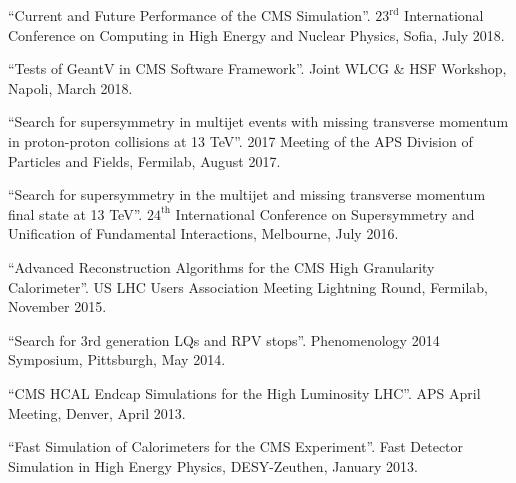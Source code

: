 \begin{nbdescription}[leftmargin=12pt,font=\normalfont,labelsep=0em]
\item ``Current and Future Performance of the CMS Simulation''. $23^{\text{rd}}$ International Conference on Computing in High Energy and Nuclear Physics, Sofia, July 2018.
\item ``Tests of GeantV in CMS Software Framework''. Joint WLCG \& HSF Workshop, Napoli, March 2018.
\item ``Search for supersymmetry in multijet events with missing transverse momentum in proton-proton collisions at 13 TeV''. 2017 Meeting of the APS Division of Particles and Fields, Fermilab, August 2017.
\item ``Search for supersymmetry in the multijet and missing transverse momentum final state at 13 TeV''. $24^{\text{th}}$ International Conference on Supersymmetry and Unification of Fundamental Interactions, Melbourne, July 2016.
\item ``Advanced Reconstruction Algorithms for the CMS High Granularity Calorimeter''. US LHC Users Association Meeting Lightning Round, Fermilab, November 2015.
\item ``Search for 3rd generation LQs and RPV stops''. Phenomenology 2014 Symposium, Pittsburgh, May 2014.
\item ``CMS HCAL Endcap Simulations for the High Luminosity LHC''. APS April Meeting, Denver, April 2013.
\item ``Fast Simulation of Calorimeters for the CMS Experiment''. Fast Detector Simulation in High Energy Physics, DESY-Zeuthen, January 2013.
\end{nbdescription}

